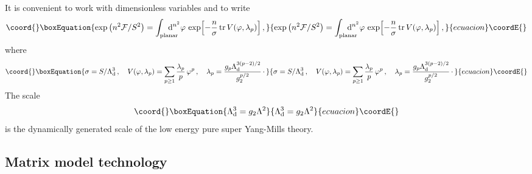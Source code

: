 \documentclass[a4paper,12pt]{article}
\def\tr{\mathop{\rm tr}\nolimits}
\def\d{{\rm d}}
\begin{document}
It is convenient to work with dimensionless variables and to write
%
\begin{equation}\coord{}\boxEquation{
\label{DVint2}
\exp\left( n^{2}\F /S^{2}\right) = \int_{\rm planar}
\hskip -.5cm\d^{n^{2}}\varphi\,
\exp\Bigl[ -{n\over\sigma}\tr V(\varphi,\lambda_{p})\Bigr]\, ,
}{
\exp\left( n^{2}\F /S^{2}\right) = \int_{\rm planar}
\hskip -.5cm\d^{n^{2}}\varphi\,
\exp\Bigl[ -{n\over\sigma}\tr V(\varphi,\lambda_{p})\Bigr]\, ,
}{ecuacion}\coordE{}\end{equation}
%
where
%
\begin{equation}\coord{}\boxEquation{
\label{dimless}
\sigma = S/\Ld^{3}\, ,\quad
V(\varphi,\lambda_{p}) = \sum_{p\geq 1} {\lambda_{p}\over p}\, 
\varphi^{p}\, , \quad \lambda_{p} = 
{g_{p}\Ld^{3(p-2)/2}\over g_{2}^{p/2}}\,\cdotp
}{
\sigma = S/\Ld^{3}\, ,\quad
V(\varphi,\lambda_{p}) = \sum_{p\geq 1} {\lambda_{p}\over p}\, 
\varphi^{p}\, , \quad \lambda_{p} = 
{g_{p}\Ld^{3(p-2)/2}\over g_{2}^{p/2}}\,\cdotp
}{ecuacion}\coordE{}\end{equation}
%
The scale
%
\begin{equation}\coord{}\boxEquation{
\label{Lddef}
\Ld^{3} = g_{2}\L^{2}
}{
\Ld^{3} = g_{2}\L^{2}
}{ecuacion}\coordE{}\end{equation}
%
is the dynamically generated scale of 
the low energy pure \coordHE{} super Yang-Mills theory.

%
\subsection{Matrix model technology}
%
\end{document}
